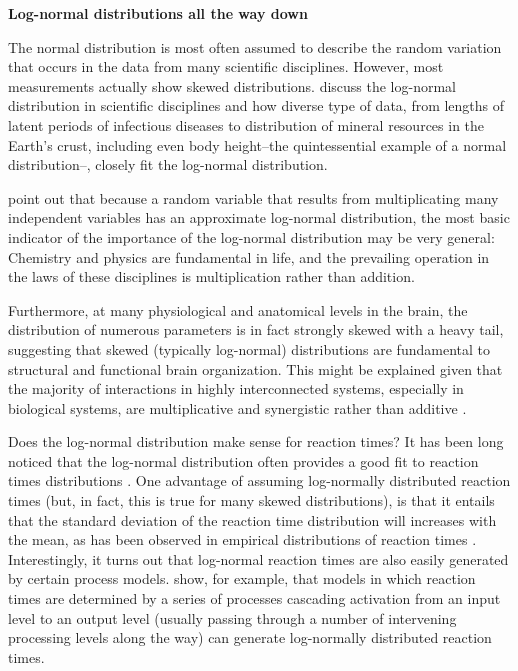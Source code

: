 \documentclass[12pt,]{krantz}
\theoremstyle{definition}
\theoremstyle{definition}
\theoremstyle{definition}
\theoremstyle{remark}
\begin{document}
\textbf{Log-normal distributions all the way down}

The normal distribution is most often assumed to describe the random variation that occurs in the data from many scientific disciplines. However, most measurements actually show skewed distributions. \citet{limpertLognormalDistributionsSciences2001} discuss the log-normal distribution in scientific disciplines and how diverse type of data, from lengths of latent periods of infectious diseases to distribution of mineral resources in the Earth's crust, including even body height--the quintessential example of a normal distribution--, closely fit the log-normal distribution.

\citet{limpertLognormalDistributionsSciences2001} point out that because a random variable that results from multiplicating many independent variables has an approximate log-normal distribution, the most basic indicator of the importance of the log-normal distribution may be very general: Chemistry and physics are fundamental in life, and the prevailing operation in the laws of these disciplines is multiplication rather than addition.

Furthermore, at many physiological and anatomical levels in the brain, the distribution of numerous parameters is in fact strongly skewed with a heavy tail, suggesting that skewed (typically log-normal) distributions are fundamental to structural and functional brain organization. This might be explained given that the majority of interactions in highly interconnected systems, especially in biological systems, are multiplicative and synergistic rather than additive \citep{buzsakiLogdynamicBrainHow2014}.

Does the log-normal distribution make sense for reaction times?
It has been long noticed that the log-normal distribution often provides a good fit to reaction times
distributions \citep{breeDistributionProblemsolvingTimes1975, ulrichEffectsTruncationReaction1994}.
One advantage of assuming log-normally distributed reaction times (but, in fact, this is true for many skewed distributions), is that it entails that the standard deviation of the reaction time distribution will increases with the mean, as has been observed in empirical distributions of reaction times \citep{wagenmakersRelationMeanVariance2005}. Interestingly, it turns out that log-normal reaction times are also easily generated by certain process models. \citet{ulrichInformationProcessingModels1993} show, for example, that models in which reaction times are determined by a series of processes cascading activation from an input level to an output level (usually passing through a number of intervening processing levels along the way) can generate log-normally distributed reaction times.
\end{document}
